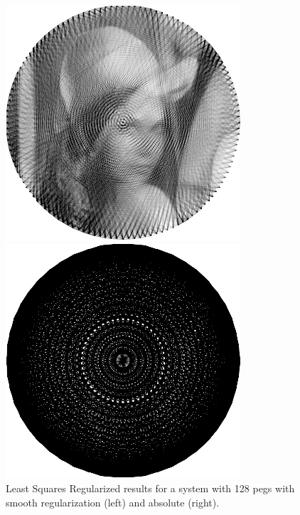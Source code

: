 \begin{figure}[H]
    \centering
    \begin{minipage}{0.2\linewidth}
        \centering
        \includegraphics[width=\linewidth]{images/lsr/lsr_smooth.png}
    \end{minipage}
    \begin{minipage}{0.2\linewidth}
        \centering
        \includegraphics[width=\linewidth]{images/lsr/lsr_abs.png}
    \end{minipage}
    \caption{Least Squares Regularized results for a system with 128 pegs with smooth regularization (left) and absolute (right).}
    \label{fig:lsr_output}
\end{figure}

